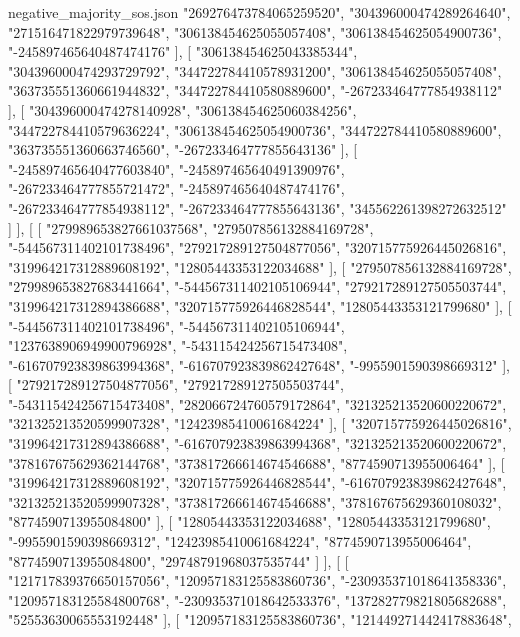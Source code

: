 \begin{filecontents*}[overwrite]{negative_majority_sos.json}
    "269276473784065259520",
    "304396000474289264640",
    "271516471822979739648",
    "306138454625055057408",
    "306138454625054900736",
    "-245897465640487474176"
   ],
   [
    "306138454625043385344",
    "304396000474293729792",
    "344722784410578931200",
    "306138454625055057408",
    "363735551360661944832",
    "344722784410580889600",
    "-267233464777854938112"
   ],
   [
    "304396000474278140928",
    "306138454625060384256",
    "344722784410579636224",
    "306138454625054900736",
    "344722784410580889600",
    "363735551360663746560",
    "-267233464777855643136"
   ],
   [
    "-245897465640477603840",
    "-245897465640491390976",
    "-267233464777855721472",
    "-245897465640487474176",
    "-267233464777854938112",
    "-267233464777855643136",
    "345562261398272632512"
   ]
  ],
  [
   [
    "279989653827661037568",
    "279507856132884169728",
    "-544567311402101738496",
    "279217289127504877056",
    "320715775926445026816",
    "319964217312889608192",
    "12805443353122034688"
   ],
   [
    "279507856132884169728",
    "279989653827683441664",
    "-544567311402105106944",
    "279217289127505503744",
    "319964217312894386688",
    "320715775926446828544",
    "12805443353121799680"
   ],
   [
    "-544567311402101738496",
    "-544567311402105106944",
    "1237638906949900796928",
    "-543115424256715473408",
    "-616707923839863994368",
    "-616707923839862427648",
    "-9955901590398669312"
   ],
   [
    "279217289127504877056",
    "279217289127505503744",
    "-543115424256715473408",
    "282066724760579172864",
    "321325213520600220672",
    "321325213520599907328",
    "12423985410061684224"
   ],
   [
    "320715775926445026816",
    "319964217312894386688",
    "-616707923839863994368",
    "321325213520600220672",
    "378167675629362144768",
    "373817266614674546688",
    "8774590713955006464"
   ],
   [
    "319964217312889608192",
    "320715775926446828544",
    "-616707923839862427648",
    "321325213520599907328",
    "373817266614674546688",
    "378167675629360108032",
    "8774590713955084800"
   ],
   [
    "12805443353122034688",
    "12805443353121799680",
    "-9955901590398669312",
    "12423985410061684224",
    "8774590713955006464",
    "8774590713955084800",
    "29748791968037535744"
   ]
  ],
  [
   [
    "121717839376650157056",
    "120957183125583860736",
    "-230935371018641358336",
    "120957183125584800768",
    "-230935371018642533376",
    "137282779821805682688",
    "52553630065553192448"
   ],
   [
    "120957183125583860736",
    "121449271442417883648",

\end{filecontents*}
